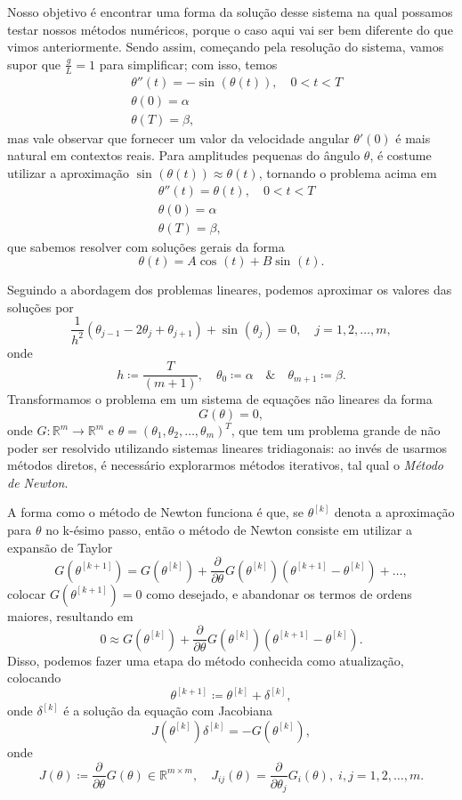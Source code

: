 \documentclass[../differential_methods.tex]{subfiles}
\begin{document}
Nosso objetivo é encontrar uma forma da solução desse sistema na qual possamos testar nossos métodos numéricos, porque o caso aqui vai ser bem diferente do que vimos anteriormente. Sendo assim, começando pela resolução do sistema, vamos supor que \(\frac{g}{L}=1\) para simplificar; com isso, temos
\begin{align*}
	 & \theta ''(t)=-\sin^{}{(\theta (t))}, \quad 0<t<T \\
	 & \theta (0)=\alpha                                \\
	 & \theta (T)=\beta ,
\end{align*}
mas vale observar que fornecer um valor da velocidade angular \(\theta'(0)\) é mais natural em contextos reais. Para amplitudes pequenas do ângulo \(\theta \), é costume utilizar a aproximação \(\sin^{}{(\theta (t))}\approx \theta (t)\), tornando o problema acima em
\begin{align*}
	 & \theta ''(t)=\theta (t), \quad 0<t<T \\
	 & \theta (0)=\alpha                    \\
	 & \theta (T)=\beta ,
\end{align*}
que sabemos resolver com soluções gerais da forma
\[
	\theta (t)=A\cos^{}{(t)}+B\sin^{}{(t)}.
\]

Seguindo a abordagem dos problemas lineares, podemos aproximar os valores das soluções por
\[
	\frac{1}{h^{2}}(\theta_{j-1}-2\theta_{j}+\theta_{j+1})+\sin^{}{(\theta_{j})}=0, \quad j=1,2,\dotsc ,m,
\]
onde
\[
	h\coloneqq \frac{T}{(m+1)},\quad \theta_{0}\coloneqq \alpha  \quad\&\quad \theta_{m+1}\coloneqq \beta .
\]
Transformamos o problema em um sistema de equações não lineares da forma
\[
	G(\theta )=0,
\]
onde \(G:\mathbb{R}^{m}\rightarrow \mathbb{R}^{m}\) e \(\theta = (\theta_1, \theta_2, \dotsc , \theta_{m})^{T}\),
que tem um problema grande de não poder ser resolvido utilizando sistemas lineares tridiagonais: ao invés de usarmos métodos diretos, é necessário explorarmos métodos iterativos, tal qual o \textit{Método de Newton}.

A forma como o método de Newton funciona é que, se \(\theta^{[k]}\) denota a aproximação para \(\theta \) no k-ésimo passo, então o método de Newton consiste em utilizar a expansão de Taylor
\[
	G(\theta^{[k+1]})=G(\theta^{[k]})+\frac{\partial^{}}{\partial \theta ^{}}G(\theta^{[k]})(\theta^{[k+1]}-\theta^{[k]})+\dotsc,
\]
colocar \(G(\theta^{[k+1]})=0\) como desejado, e abandonar os termos de ordens maiores, resultando em
\[
	0\approx G(\theta^{[k]})+\frac{\partial^{}}{\partial \theta ^{}}G(\theta^{[k]})(\theta^{[k+1]}-\theta^{[k]}).
\]
Disso, podemos fazer uma etapa do método conhecida como atualização, colocando
\[
	\theta^{[k+1]}\coloneqq \theta^{[k]}+\delta^{[k]},
\]
onde \(\delta^{[k]}\) é a solução da equação com Jacobiana
\[
	J(\theta^{[k]})\delta^{[k]}=-G(\theta^{[k]} ),
\]
onde
\[
	J(\theta )\coloneqq \frac{\partial^{}}{\partial \theta ^{}}G(\theta )\in \mathbb{R}^{m\times m}, \quad J_{ij}(\theta )=\frac{\partial^{}}{\partial \theta_{j}^{}}G_{i}(\theta ),\; i, j=1,2,\dotsc ,m.
\]
\end{document}

